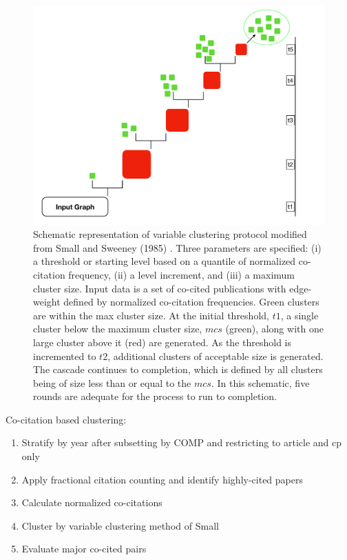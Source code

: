 \begin{figure}[ht]
\centering
  \includegraphics[scale=0.25]{vlc.pdf}
\caption{Schematic representation of variable clustering protocol modified from Small and Sweeney (1985) \cite{small_clustering_1985}. Three parameters are specified: (i) a threshold or starting level based on a quantile of normalized co-citation frequency, (ii) a level increment, and  (iii) a maximum cluster size. Input data is a set of co-cited publications with edge-weight defined by normalized co-citation frequencies. Green clusters are within the max cluster size. At the initial threshold, $t1$, a single cluster below the maximum cluster size, $mcs$ (green), along with one large cluster above it (red) are generated. As the threshold is incremented to $t2$, additional clusters of acceptable size is generated. The cascade continues to completion, which is defined by all clusters being of size less than or equal to the $mcs$. In this schematic, five rounds are adequate for the process to run to completion.}
\label{vlc_process}       %
\end{figure}

Co-citation based clustering:
\begin{enumerate}
\item Stratify by year after subsetting by COMP and restricting to article and cp only
\item Apply fractional citation counting and identify highly-cited papers
\item Calculate normalized co-citations
\item Cluster by variable clustering method of Small
\item Evaluate major co-cited pairs
\end{enumerate}

